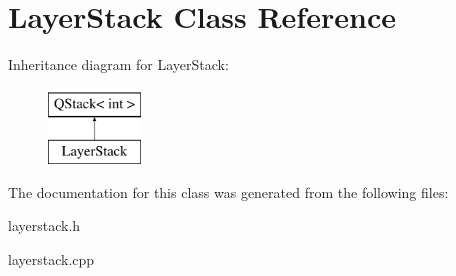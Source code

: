 \hypertarget{class_layer_stack}{\section{Layer\-Stack Class Reference}
\label{class_layer_stack}
}
Inheritance diagram for Layer\-Stack\-:\begin{figure}[H]
\begin{center}
\leavevmode
\includegraphics[height=2.000000cm]{class_layer_stack}
\end{center}
\end{figure}


The documentation for this class was generated from the following files\-:\begin{DoxyCompactItemize}
\item 
layerstack.\-h\item 
layerstack.\-cpp\end{DoxyCompactItemize}
